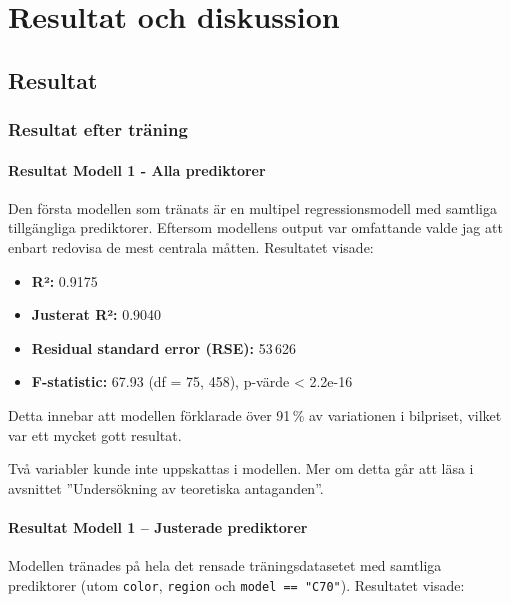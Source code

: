 \documentclass[
  letterpaper,
  DIV=11,
  numbers=noendperiod]{scrreprt}
\providecommand{\tightlist}{%
  \setlength{\itemsep}{0pt}\setlength{\parskip}{0pt}}\usepackage{longtable,booktabs,array}
\begin{document}

\chapter{Resultat och diskussion}\label{resultat-och-diskussion}

\section{Resultat}\label{resultat}

\subsection{Resultat efter träning}\label{resultat-efter-truxe4ning}

\subsubsection{Resultat Modell 1 - Alla
prediktorer}\label{resultat-modell-1---alla-prediktorer}

Den första modellen som tränats är en multipel regressionsmodell med
samtliga tillgängliga prediktorer. Eftersom modellens output var
omfattande valde jag att enbart redovisa de mest centrala måtten.
Resultatet visade:

\begin{itemize}
\tightlist
\item
  \textbf{R²:} 0.9175
\item
  \textbf{Justerat R²:} 0.9040
\item
  \textbf{Residual standard error (RSE):} 53\,626
\item
  \textbf{F-statistic:} 67.93 (df = 75, 458), p-värde \textless{}
  2.2e-16
\end{itemize}

Detta innebar att modellen förklarade över 91\,\% av variationen i
bilpriset, vilket var ett mycket gott resultat.

Två variabler kunde inte uppskattas i modellen. Mer om detta går att
läsa i avsnittet ''Undersökning av teoretiska antaganden''.

\subsubsection{Resultat Modell 1 -- Justerade
prediktorer}\label{resultat-modell-1-justerade-prediktorer}

Modellen tränades på hela det rensade träningsdatasetet med samtliga
prediktorer (utom \texttt{color}, \texttt{region} och
\texttt{model\ ==\ "C70"}). Resultatet visade:
\end{document}
